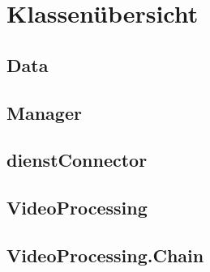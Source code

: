 \newpage
\section{Klassenübersicht}

\subsection{Data}

\newpage


\newpage


\newpage


\newpage


\newpage

\subsection{Manager}

\newpage


\newpage

\subsection{dienstConnector}

\newpage

\subsection{VideoProcessing}

\newpage


\newpage


\newpage


\newpage

\subsection{VideoProcessing.Chain}


\newpage

